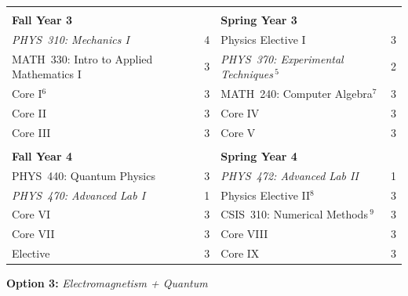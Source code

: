 \documentclass[12pt]{article}
\begin{document}
\begin{table}[h!]
\begin{center}
{\renewcommand{\arraystretch}{1.2}
\begin{tabular*}{0.9\textwidth}{@{\extracolsep{\fill}}lclc}

 & \\
{\Large \textbf{Fall Year 3}} & & {\Large \textbf{Spring Year 3}} & \\
\hline
{\em PHYS~310: Mechanics I}         		& 4 & Physics Elective I           						& 3 \\
MATH~330: Intro to Applied Mathematics I 	& 3 & {\em PHYS~370: Experimental Techniques}\,$^{5}$ 	& 2 \\
Core I$^{6}$ 								& 3 & MATH~240: Computer Algebra$^{7}$    				& 3 \\
Core II 									& 3 & Core IV 											&3  \\
Core III 									& 3 & Core V 											&3  \\
& \\
 
{\Large \textbf{Fall Year 4}} & & {\Large \textbf{Spring Year 4}} & \\
\hline
PHYS~440: Quantum Physics 					& 3 & {\em PHYS~472: Advanced Lab II}  					& 1 \\
{\em PHYS~470: Advanced Lab I}       		& 1 & Physics Elective II$^{8}$        					& 3 \\
Core VI                       				& 3 & CSIS~310: Numerical Methods\,$^{9}$ 				& 3 \\
Core VII                       				& 3 & Core VIII											& 3 \\
Elective                     			    & 3 & Core IX  											& 3 \\
\hline
\end{tabular*}
}
\end{center}
\end{table}

\newpage


\begin{center}
{ \Large \textbf {Option 3:} {\em Electromagnetism + Quantum}}
\end{center}
\end{document}
